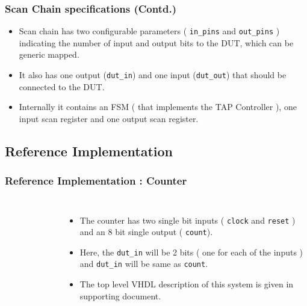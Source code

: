 \documentclass{beamer}
\begin{document}
\begin{frame}
\frametitle{Scan Chain specifications (Contd.)}

\begin{itemize}
\item Scan chain has two configurable parameters ( \texttt{in\_pins} and \texttt{out\_pins} ) indicating the number of input and output bits to the DUT, which can be generic mapped.
\item It also has one output (\texttt{dut\_in}) and one input (\texttt{dut\_out}) that should be connected to the DUT.
\item Internally it contains an FSM ( that implements the TAP Controller ), one input scan register and one output scan register.
\end{itemize}

\end{frame}

\subsection{Reference Implementation}

\begin{frame}
\frametitle{Reference Implementation : Counter}
\begin{columns}[l] %

\begin{figure}[h!]
\centering

\end{figure}

\begin{itemize}
\item The counter has two single bit inputs ( \texttt{clock} and \texttt{reset} ) and an 8 bit single output ( \texttt{count}).
\item Here, the \texttt{dut\_in} will be 2 bits ( one for each of the inputs ) and \texttt{dut\_in} will be same as \texttt{count}.
\item The top level VHDL description of this system is given in supporting document.
\end{itemize}

\end{columns}
\end{frame}

\end{document}

